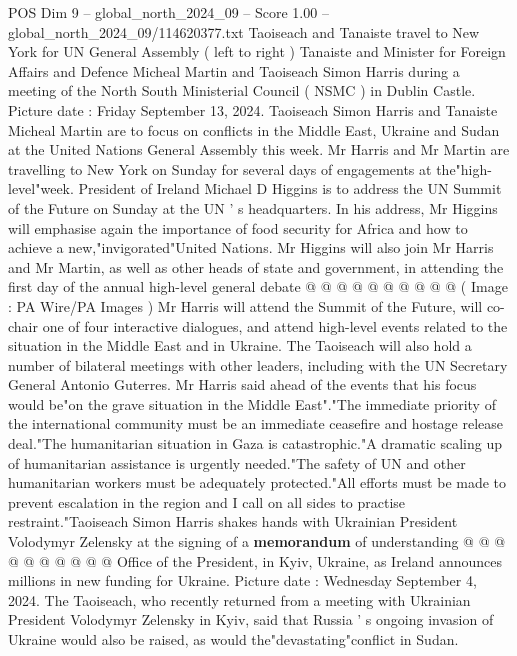 \begin{textsample}{POS Dim 9 – global\_north\_2024\_09 – Score 1.00 – global\_north\_2024\_09/114620377.txt}  \label{ex:f9_pos_427}
Taoiseach and Tanaiste travel to New York for UN General Assembly ( left to right ) Tanaiste and Minister for Foreign Affairs and Defence Micheal Martin and Taoiseach Simon Harris during a meeting of the North South Ministerial Council ( NSMC ) in Dublin Castle.
Picture date : Friday September 13, 2024.
Taoiseach Simon Harris and Tanaiste Micheal Martin are to focus on conflicts in the Middle East, Ukraine and Sudan at the United Nations General Assembly this week.
Mr Harris and Mr Martin are travelling to New York on Sunday for several days of engagements at the"high-level"week.
President of Ireland Michael D Higgins is to address the UN Summit of the Future on Sunday at the UN ' s headquarters.
In his address, Mr Higgins will emphasise again the importance of food security for Africa and how to achieve a new,"invigorated"United Nations.
Mr Higgins will also join Mr Harris and Mr Martin, as well as other heads of state and government, in attending the first day of the annual high-level general debate @ @ @ @ @ @ @ @ @ @ ( Image : PA Wire/PA Images ) Mr Harris will attend the Summit of the Future, will co-chair one of four interactive dialogues, and attend high-level events related to the situation in the Middle East and in Ukraine.
The Taoiseach will also hold a number of bilateral meetings with other leaders, including with the UN Secretary General Antonio Guterres.
Mr Harris said ahead of the events that his focus would be"on the grave situation in the Middle East"."The immediate priority of the international community must be an immediate ceasefire and hostage release deal."The humanitarian situation in Gaza is catastrophic."A dramatic scaling up of humanitarian assistance is urgently needed."The safety of UN and other humanitarian workers must be adequately protected."All efforts must be made to prevent escalation in the region and I call on all sides to practise restraint."Taoiseach Simon Harris shakes hands with Ukrainian President Volodymyr Zelensky at the signing of a \textbf{memorandum} of understanding @ @ @ @ @ @ @ @ @ @ Office of the President, in Kyiv, Ukraine, as Ireland announces millions in new funding for Ukraine.
Picture date : Wednesday September 4, 2024.
The Taoiseach, who recently returned from a meeting with Ukrainian President Volodymyr Zelensky in Kyiv, said that Russia ' s ongoing invasion of Ukraine would also be raised, as would the"devastating"conflict in Sudan.

\end{textsample}
